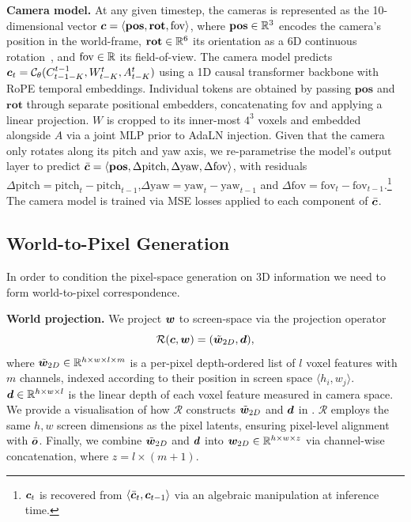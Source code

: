 \documentclass{article}
\theoremstyle{plain}
\theoremstyle{definition}
\theoremstyle{remark}
\begin{document}
\textbf{Camera model.} At any given timestep, the cameras is represented as the 10-dimensional vector ${\bm{c}} = \langle\textbf{pos}, \textbf{rot}, \text{fov}\rangle$, where $\textbf{pos}\in {\mathbb{R}}^3$ encodes the camera's position in the world-frame, $\textbf{rot}\in {\mathbb{R}}^6$ its orientation as a 6D continuous rotation~\citep{zhou2019continuity}, and $\text{fov}\in {\mathbb{R}}$ its field-of-view. The camera model predicts ${\bm{c}}_{t} = {\mathcal{C}}_\theta (C^{t-1}_{t-1-K}, W^t_{t-K}, A^t_{t-K})$ using a 1D causal transformer backbone with RoPE temporal embeddings. Individual tokens are obtained by passing $\textbf{pos}$ and $\textbf{rot}$  through separate positional embedders, concatenating $\text{fov}$ and applying a linear projection. $W$ is cropped to its inner-most $4^3$ voxels and embedded alongside $A$ via a joint MLP prior to AdaLN injection. Given that the camera only rotates along its pitch and yaw axis, we re-parametrise the model's output layer to predict $\bar{{\bm{c}}}=\langle \textbf{pos}, \Delta\text{pitch}, \Delta\text{yaw}, \Delta\text{fov}\rangle$, with residuals $\Delta\text{pitch} = \text{pitch}_t - \text{pitch}_{t-1}$,$\Delta\text{yaw} =\text{yaw}_t - \text{yaw}_{t-1}$ and $\Delta \text{fov}=\text{fov}_t - \text{fov}_{t-1}$.\footnote{${\bm{c}}_t$ is recovered from $\langle \bar{{\bm{c}}}_t, {\bm{c}}_{t-1}\rangle$ via an algebraic manipulation at inference time.} The camera model is trained via MSE losses applied to each component of $\bar{{\bm{c}}}$.

\subsection{World-to-Pixel Generation}

In order to condition the pixel-space generation on 3D information we need to form world-to-pixel correspondence.

\textbf{World projection.} We project ${\bm{w}}$ to screen-space via the projection operator \begin{equation}
    \mathcal{R}({\bm{c}}, {\bm{w}}) = (\tilde{{\bm{w}}}_{2D}, {\bm{d}}), 
\end{equation}
where $\tilde{{\bm{w}}}_{2D}  \in \mathbb{R}^{h \times w \times l \times m}$ is a per-pixel depth-ordered list of $l$ voxel features with $m$ channels, indexed according to their position in screen space $\langle h_i, w_j\rangle$. ${\bm{d}} \in \mathbb{R}^{h \times w \times l}$ is the linear depth of each voxel feature measured in camera space. We provide a visualisation of how $\mathcal{R}$ constructs $\tilde{{\bm{w}}}_{2D}$ and ${\bm{d}}$ in . $\mathcal{R}$ employs the same $h,w$ screen dimensions as the pixel latents, ensuring pixel-level alignment with $\bar{{\bm{o}}}$. Finally, we combine $\tilde{{\bm{w}}}_{2D}$ and ${\bm{d}}$ into ${\bm{w}}_{2D}\in \mathbb{R}^{h \times w \times z}$ via channel-wise concatenation, where $z = l \times (m+1)$. %
\end{document}
